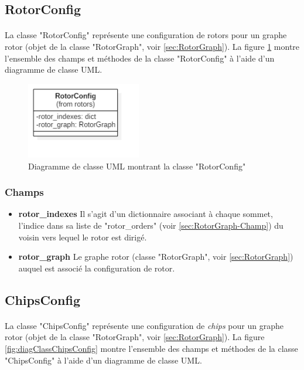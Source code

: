 \documentclass{article}
\begin{document}
	\subsection{RotorConfig}
	\paragraph*{}
	La classe "RotorConfig" représente une configuration de rotors pour un graphe rotor (objet de la classe "RotorGraph", voir \ref{sec:RotorGraph}). La figure \ref{fig:diagClassRotorConfig} montre l'ensemble des champs et méthodes de la classe "RotorConfig" à l'aide d'un diagramme de classe UML.
	
	\begin{figure}[h]
		\includegraphics[width=5cm]{diagClassRotorConfig.png}
		\centering
		\caption{Diagramme de classe UML montrant la classe "RotorConfig"}
		\label{fig:diagClassRotorConfig}
	\end{figure}
	
	\subsubsection{Champs}
	\begin{itemize}	
		\item \textbf{rotor\_indexes}\newline
		Il s'agit d'un dictionnaire associant à chaque sommet, l'indice dans sa liste de "rotor\_orders" (voir \ref{sec:RotorGraph-Champ}) du voisin vers lequel le rotor est dirigé.
		\item \textbf{rotor\_graph}\newline
		Le graphe rotor (classe "RotorGraph", voir \ref{sec:RotorGraph}) auquel est associé la configuration de rotor.
	\end{itemize}

	\subsection{ChipsConfig}
	\paragraph*{}
	La classe "ChipsConfig" représente une configuration de \textit{chips} pour un graphe rotor (objet de la classe "RotorGraph", voir \ref{sec:RotorGraph}). La figure \ref{fig:diagClassChipsConfig} montre l'ensemble des champs et méthodes de la classe "ChipsConfig" à l'aide d'un diagramme de classe UML.
	
\end{document}
